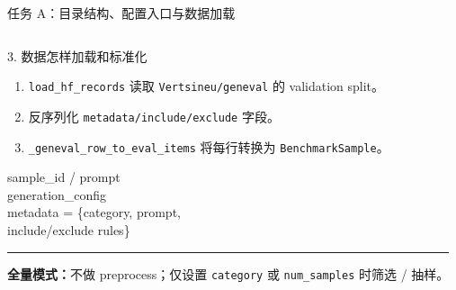\documentclass[aspectratio=169,10pt]{beamer}
\begin{document}
\begin{frame}{任务 A：目录结构、配置入口与数据加载}
\begin{columns}[T,onlytextwidth]
      \begin{block}{3. 数据怎样加载和标准化}
        \begin{minipage}[c][5.05cm][c]{\linewidth}
          \begin{enumerate}\scriptsize
            \item \texttt{load\_hf\_records} 读取 \texttt{Vertsineu/geneval} 的 validation split。
            \item 反序列化 \texttt{metadata/include/exclude} 字段。
            \item \texttt{\_geneval\_row\_to\_eval\_items} 将每行转换为 \texttt{BenchmarkSample}。
          \end{enumerate}
          \scriptsize\ttfamily
          sample\_id / prompt\\
          generation\_config\\
          metadata = \{category, prompt,\\
          \qquad include/exclude rules\}
          \vspace{0.45em}
          \color{T2IGray}\rule{\linewidth}{0.35pt}\par\vspace{0.3em}
          \scriptsize\rmfamily
          \textbf{全量模式：}不做 preprocess；仅设置 \texttt{category} 或 \texttt{num\_samples} 时筛选 / 抽样。
        \end{minipage}
      \end{block}
  \end{columns}
\end{frame}
\end{document}
